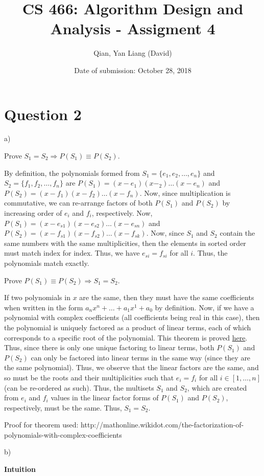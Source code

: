 \documentclass{article}
\title{CS 466: Algorithm Design and Analysis - Assigment 4}
\author{Qian, Yan Liang (David)}
\date{Date of submission: October 28, 2018}
\begin{document}
\newpage

\section{Question 2}

a)

Prove $S_1 = S_2 \Rightarrow P(S_1) \equiv P(S_2)$.

By definition, the polynomials formed from $S_1 = \{e_1, e_2, \ldots, e_n \}$ and $S_2 = \{f_1, f_2, \ldots, f_n\}$ are
$P(S_1) = (x - e_1)(x - _2)\ldots(x - e_n)$ and $P(S_2) = (x - f_1)(x - f_2)\ldots(x - f_n)$. Now, since multiplication
is commutative, we can re-arrange factors of both $P(S_1)$ and $P(S_2)$ by increasing order of $e_i$ and $f_i$,
respectively. Now, $P(S_1) = (x - e_{s1})(x - e_{s2})\ldots(x - e_{sn})$ and $P(S_2) = (x - f_{s1})(x - f_{s2})\ldots(x -
f_{sk})$.  Now, since $S_1$ and $S_2$ contain the same numbers with the same multiplicities, then the elements in sorted
order must match index for index. Thus, we have $e_{si} = f_{si}$ for all $i$. Thus, the polynomials match exactly.

Prove $P(S_1) \equiv P(S_2) \Rightarrow S_1 = S_2$.

If two polynomials in $x$ are the same, then they must have the same coefficients when written in the form $a_n x^n +
\ldots + a_1 x^1 + a_0$ by definition. Now, if we have a polynomial with complex coefficients (all coefficients being
real in this case), then the polynomial is uniquely factored as a product of linear terms, each of which corresponds to
a specific root of the polynomial. This theorem is proved
\href{http://mathonline.wikidot.com/the-factorization-of-polynomials-with-complex-coefficients}{here}. Thus, since there
is only one unique factoring to linear terms, both $P(S_1)$ and $P(S_2)$ can only be factored into linear terms in the
same way (since they are the same polynomial). Thus, we observe that the linear factors are the same, and so must be the
roots and their multiplicities such that $e_i = f_i$ for all $i \in [1, \ldots, n]$ (can be re-ordered as such). Thus,
the multisets $S_1$ and $S_2$, which are created from $e_i$ and $f_i$ values in the linear factor forms of $P(S_1)$ and
$P(S_2)$, respectively, must be the same. Thus, $S_1 = S_2$.

Proof for theorem used: http://mathonline.wikidot.com/the-factorization-of-polynomials-with-complex-coefficients


b)

\textbf{Intuition}
\end{document}

